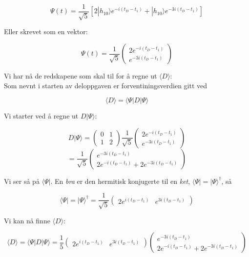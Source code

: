 \documentclass[a4paper,norsk, 10pt]{article}
\numberwithin{equation}{section}
\begin{document}
\begin{equation}
\Psi(t) = \frac{1}{\sqrt{5}}\left[2|h_{10}\rangle e^{-i(t_D - t_1)} + |h_{10}\rangle e^{-3i(t_D - t_1)}\right]
\label{eq:Psi(t)}
\end{equation}

Eller skrevet som en vektor:

$$
\Psi(t) = \frac{1}{\sqrt{5}}
\begin{pmatrix}
2e^{-i(t_D - t_1)}\\
e^{-3i(t_D - t_1)}
\end{pmatrix}
$$

Vi har nå de redskapene som skal til for å regne ut $\langle D \rangle$:\\

Som nevnt i starten av deloppgaven er forventiningsverdien gitt ved

$$
\langle D\rangle = \langle\Psi | D | \Psi \rangle
$$

Vi starter ved å regne ut $D|\Psi\rangle$:

$$
D|\Psi\rangle =
\begin{pmatrix}
0 &1\\1&2
\end{pmatrix}
\frac{1}{\sqrt{5}}
\begin{pmatrix}
2e^{-i(t_D - t_1)}\\
e^{-3i(t_D - t_1)}
\end{pmatrix}
$$
$$
= \frac{1}{\sqrt{5}}
\begin{pmatrix}
e^{-3i(t_D-t_1)}\\
2e^{-i(t_D-t_1)} + 2e^{-3i(t_D-t_1)}
\end{pmatrix}
$$

Vi ser så på $\langle \Psi |$. En \textit{bra} er den hermitisk konjugerte til en \textit{ket}, $\langle\Psi| = |\Psi\rangle^{\dag}$, så

$$
\langle\Psi| = |\Psi\rangle^{\dag} = \frac{1}{\sqrt{5}}
\begin{pmatrix}
2e^{i(t_D - t_1)} &
e^{3i(t_D - t_1)}
\end{pmatrix}
$$

Vi kan nå finne $\langle D \rangle$:

$$
\langle D\rangle = \langle\Psi | D | \Psi \rangle = 
\frac{1}{5}
\begin{pmatrix}
2e^{i(t_D - t_1)} &
e^{3i(t_D - t_1)}
\end{pmatrix}
\begin{pmatrix}
e^{-3i(t_D-t_1)}\\
2e^{-i(t_D-t_1)} + 2e^{-3i(t_D-t_1)}
\end{pmatrix}
$$
\end{document}
